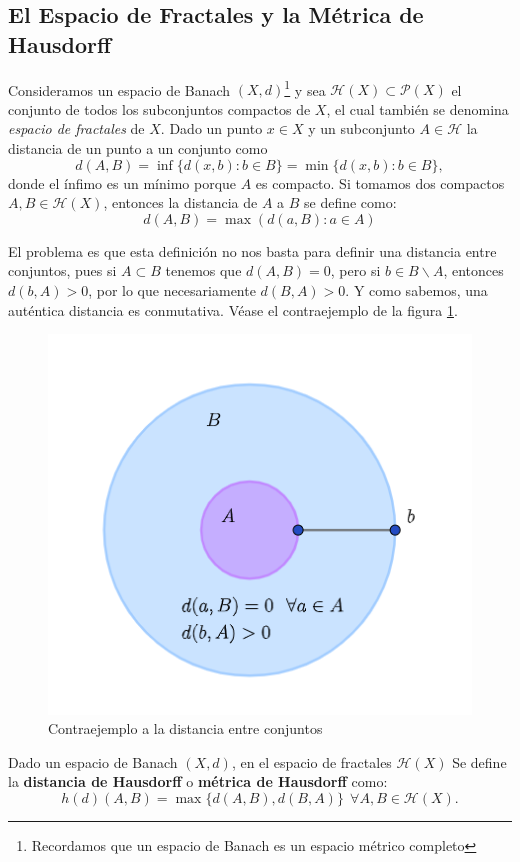 \subsection{El Espacio de Fractales y la Métrica de Hausdorff}

Consideramos un espacio de Banach $(X,d)$\footnote{Recordamos que un espacio de Banach es un espacio métrico completo} y sea $\mathcal{H}(X)\subset\mathcal P (X)$ el conjunto de todos los subconjuntos compactos de $X$, el cual también se denomina \textit{espacio de fractales} de $X$. Dado un punto $x\in X$ y un subconjunto $A\in\mathcal H$ la distancia de un punto a un conjunto como
$$
d(A,B) = \inf\{d(x,b):b\in B\}=\min\{d(x,b):b\in B\},
$$
donde el ínfimo es un mínimo porque $A$ es compacto. Si tomamos dos compactos $A,B\in\mathcal H(X)$, entonces la distancia de $A$ a $B$ se define como:
$$
d(A,B)=\max(d(a,B):a\in A)
$$

El problema es que esta definición no nos basta para definir una distancia entre conjuntos, pues si $A\subset B$ tenemos que $d(A,B)=0$, pero si $b\in B\backslash A$, entonces $d(b,A)>0$, por lo que necesariamente $d(B,A)>0$. Y como sabemos, una auténtica distancia es conmutativa. Véase el contraejemplo de la figura \ref{fig:contraejemplo-distancia}. 
\begin{figure} [ht]
    \centering
    \includegraphics[scale = 0.4]{img/C4/no-distancia-hausdorff.png}
    \caption{Contraejemplo a la distancia entre conjuntos}
        \label{fig:contraejemplo-distancia}
\end{figure}

\begin{definicion}
    Dado un espacio de Banach $(X,d)$, en el espacio de fractales $\mathcal{H}(X)$ Se define la \textbf{distancia de Hausdorff} o \textbf{métrica de Hausdorff} como:
    $$
    h(d)(A,B)=\max\{d(A,B),d(B,A)\} \ \ \forall A,B\in\mathcal H(X).
    $$
\end{definicion}


